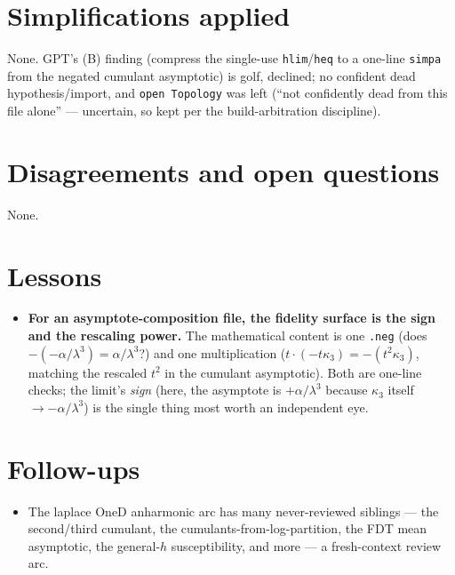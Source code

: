 \documentclass[11pt]{article}
\begin{document}
\section{Simplifications applied}
None. GPT's (B) finding (compress the single-use \texttt{hlim}/\texttt{heq} to a one-line \texttt{simpa} from
the negated cumulant asymptotic) is golf, declined; no confident dead hypothesis/import, and \texttt{open
Topology} was left (``not confidently dead from this file alone'' --- uncertain, so kept per the
build-arbitration discipline).

\section{Disagreements and open questions}
None.

\section{Lessons}
\begin{itemize}[noitemsep]
  \item \textbf{For an asymptote-composition file, the fidelity surface is the sign and the rescaling power.}
    The mathematical content is one \texttt{.neg} (does $-(-\alpha/\lambda^3)=\alpha/\lambda^3$?) and one
    multiplication ($t\cdot(-t\kappa_3)=-(t^2\kappa_3)$, matching the rescaled $t^2$ in the cumulant
    asymptotic). Both are one-line checks; the limit's \emph{sign} (here, the asymptote is $+\alpha/\lambda^3$
    because $\kappa_3$ itself $\to-\alpha/\lambda^3$) is the single thing most worth an independent eye.
\end{itemize}

\section{Follow-ups}
\begin{itemize}[noitemsep]
  \item The laplace OneD anharmonic arc has many never-reviewed siblings --- the second/third cumulant, the
    cumulants-from-log-partition, the FDT mean asymptotic, the general-$h$ susceptibility, and more --- a
    fresh-context review arc.
\end{itemize}
\end{document}
